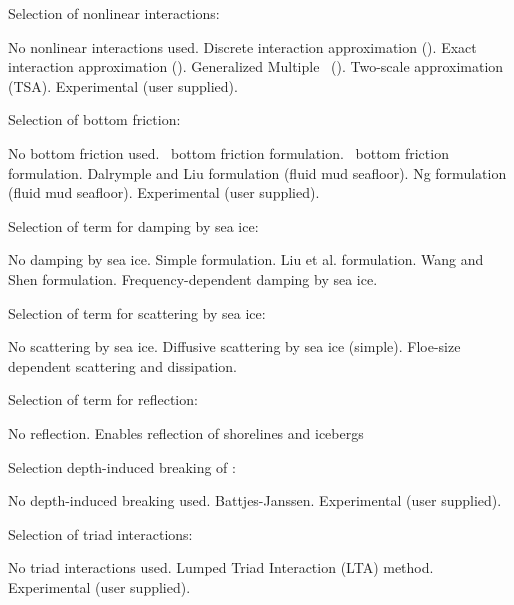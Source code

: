 \noindent
Selection of nonlinear interactions:
\begin{slist}
 {No nonlinear interactions used.}
 {Discrete interaction approximation (\dia).}
 {Exact interaction approximation (\xnl).}
 {Generalized Multiple \dia\ (\gmd).}
 {Two-scale approximation (TSA).} 
 {Experimental (user supplied).}
\end{slist}

\noindent
Selection of bottom friction:
\begin{slist}
 {No bottom friction used.}
 {\js\ bottom friction formulation.}
 {\showex\ bottom friction formulation.}
 {Dalrymple and Liu formulation (fluid mud seafloor).}
 {Ng formulation (fluid mud seafloor).}
 {Experimental (user supplied).}
\end{slist}

\noindent
Selection of term for damping by sea ice:
\begin{slist}
 {No damping by sea ice.}
 {Simple formulation.}
 {Liu et al. formulation.}
 {Wang and Shen formulation.}
 {Frequency-dependent damping by sea ice.}
\end{slist}

\noindent
Selection of term for scattering by sea ice:
\begin{slist}
 {No scattering by sea ice.}
 {Diffusive scattering by sea ice (simple).}
 {Floe-size dependent scattering and dissipation.}
\end{slist}

\noindent
Selection of term for reflection:
\begin{slist}
 {No reflection.}
 {Enables reflection of shorelines and icebergs}
\end{slist}

\noindent
Selection depth-induced breaking of :
\begin{slist}
 {No depth-induced breaking used.}
 {Battjes-Janssen.}
 {Experimental (user supplied).}
\end{slist}

\noindent
Selection of triad interactions:
\begin{slist}
 {No triad interactions used.}
 {Lumped Triad Interaction (LTA) method.}
 {Experimental (user supplied).}
\end{slist}

